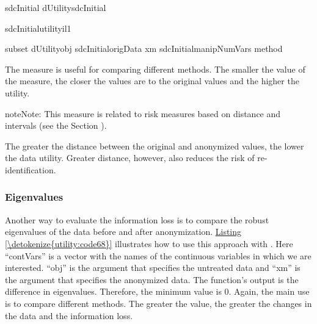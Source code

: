 \documentclass[letterpaper,10pt,english]{sphinxmanual}
\begin{document}
\def\sphinxLiteralBlockLabel{\label{\detokenize{utility:code67}}}
%
\begin{sphinxVerbatim}[commandchars=\\\{\},numbers=left,firstnumber=1,stepnumber=1]
sdcInitial  dUtilitysdcInitial

sdcInitialutilityil1

subset    
dUtilityobj  sdcInitialorigData\PYG{p}{[}\PYG{p}{]} xm  sdcInitialmanipNumVars\PYG{p}{[}\PYG{p}{]}
method  
\end{sphinxVerbatim}

The measure is useful for comparing different methods. The smaller the
value of the measure, the closer the values are to the original values
and the higher the utility.

\begin{sphinxadmonition}{note}{Note:}
This measure is related to risk measures based on distance and intervals (see
the Section ).
\end{sphinxadmonition}

The greater the distance between the original and anonymized values, the
lower the data utility. Greater distance, however, also reduces the risk
of re-identification.


\subsubsection{Eigenvalues}
\label{\detokenize{utility:eigenvalues}}
Another way to evaluate the information loss is to compare the robust
eigenvalues of the data before and after anonymization. \hyperref[\detokenize{utility:code68}]{Listing \ref{\detokenize{utility:code68}}}
illustrates how to use this approach with . Here “contVars” is
a vector with the names of the continuous variables in which we are
interested. “obj” is the argument that specifies the untreated data and
“xm” is the argument that specifies the anonymized data. The function’s
output is the difference in eigenvalues. Therefore, the minimum value is
0. Again, the main use is to compare different methods. The greater the
value, the greater the changes in the data and the information loss.
\end{document}
